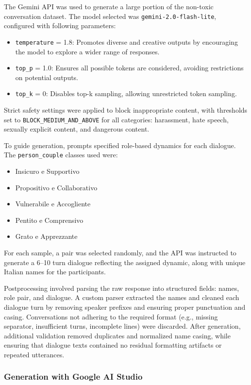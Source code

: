 \documentclass[conference]{IEEEtran}
\begin{document}
The Gemini API was used to generate a large portion of the non-toxic conversation dataset. The model selected was \texttt{gemini-2.0-flash-lite}, configured with following parameters: 
\begin{itemize}
  \item \texttt{temperature} = 1.8: Promotes diverse and creative outputs by encouraging the model to explore a wider range of responses.
  \item \texttt{top\_p} = 1.0: Ensures all possible tokens are considered, avoiding restrictions on potential outputs.
  \item \texttt{top\_k} = 0: Disables top-k sampling, allowing unrestricted token sampling.
\end{itemize}
Strict safety settings were applied to block inappropriate content, with thresholds set to \texttt{BLOCK\_MEDIUM\_AND\_ABOVE} for all categories: harassment, hate speech, sexually explicit content, and dangerous content.

To guide generation, prompts specified role-based dynamics for each dialogue. The \texttt{person\_couple} classes used were:  
\begin{itemize}
    \item Insicuro e Supportivo
    \item Propositivo e Collaborativo
    \item Vulnerabile e Accogliente
    \item Pentito e Comprensivo
    \item Grato e Apprezzante
\end{itemize}
For each sample, a pair was selected randomly, and the API was instructed to generate a 6--10 turn dialogue reflecting the assigned dynamic, along with unique Italian names for the participants.  

Postprocessing involved parsing the raw response into structured fields: names, role pair, and dialogue. A custom parser extracted the names and cleaned each dialogue turn by removing speaker prefixes and ensuring proper punctuation and casing. Conversations not adhering to the required format (e.g., missing separator, insufficient turns, incomplete lines) were discarded. After generation, additional validation removed duplicates and normalized name casing, while ensuring that dialogue texts contained no residual formatting artifacts or repeated utterances.

\subsubsection{Generation with Google AI Studio}
\end{document}
